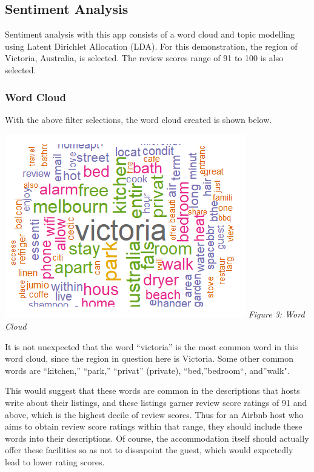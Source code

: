 \documentclass{acm_proc_article-sp}
\begin{document}
\hypertarget{sentiment-analysis-1}{%
\subsection{Sentiment Analysis}\label{sentiment-analysis-1}}

Sentiment analysis with this app consists of a word cloud and topic
modelling using Latent Dirichlet Allocation (LDA). For this
demonstration, the region of Victoria, Australia, is selected. The
review scores range of 91 to 100 is also selected.

\hypertarget{word-cloud-1}{%
\subsubsection{Word Cloud}\label{word-cloud-1}}

With the above filter selections, the word cloud created is shown below.

\includegraphics{images/wordcloud2.png} \emph{Figure 3: Word Cloud}

It is not unexpected that the word ``victoria'' is the most common word
in this word cloud, since the region in question here is Victoria. Some
other common words are ``kitchen,'' ``park,'' ``privat'' (private),
``bed,''bedroom``, and''walk".

This would suggest that these words are common in the descriptions that
hosts write about their listings, and these listings garner review score
ratings of 91 and above, which is the highest decile of review scores.
Thus for an Airbnb host who aims to obtain review score ratings within
that range, they should include these words into their descriptions. Of
course, the accommodation itself should actually offer these facilities
so as not to dissapoint the guest, which would expectedly lead to lower
rating scores.
\end{document}
